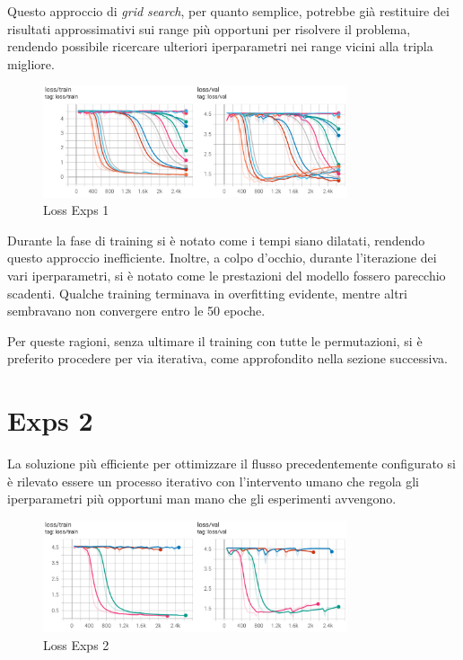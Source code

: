 Questo approccio di \emph{grid search}, per quanto semplice, potrebbe già restituire dei risultati approssimativi sui range più opportuni per risolvere il problema, rendendo possibile ricercare ulteriori iperparametri nei range vicini alla tripla migliore. 

\begin{figure}[htbp]
    \centering
    \includegraphics[width=0.8\textwidth]{images/exps1_loss.png}
    \caption{Loss Exps 1}
    \label{fig:exps1_loss}
\end{figure}

Durante la fase di training si è notato come i tempi siano dilatati, rendendo questo approccio inefficiente. Inoltre, a colpo d'occhio, durante l'iterazione dei vari iperparametri, si è notato come le prestazioni del modello fossero parecchio scadenti. Qualche training terminava in overfitting evidente, mentre altri sembravano non convergere entro le 50 epoche.

Per queste ragioni, senza ultimare il training con tutte le permutazioni, si è preferito procedere per via iterativa, come approfondito nella sezione successiva.

\section{Exps 2}

La soluzione più efficiente per ottimizzare il flusso precedentemente configurato si è rilevato essere un processo iterativo con l'intervento umano che regola gli iperparametri più opportuni man mano che gli esperimenti avvengono.

\begin{figure}[htbp]
    \centering
    \includegraphics[width=0.8\textwidth]{images/exps2_loss.png}
    \caption{Loss Exps 2}
    \label{fig:exps1_loss}
\end{figure}

